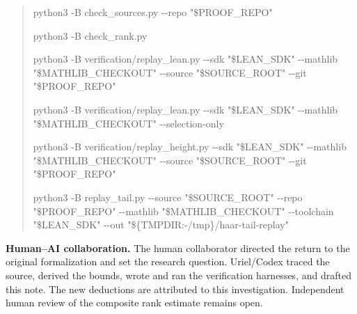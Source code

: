 \documentclass[11pt,letterpaper]{article}
\begin{document}
\begin{quote}\raggedright\setlength{\parskip}{1pt}
{\ttfamily\small python3 -\allowbreak{}B check\_\allowbreak{}sources.\allowbreak{}py -\allowbreak{}-\allowbreak{}repo "\$PROOF\_\allowbreak{}REPO"}\par
{\ttfamily\small python3 -\allowbreak{}B check\_\allowbreak{}rank.\allowbreak{}py}\par
{\ttfamily\small python3 -\allowbreak{}B verification/\allowbreak{}replay\_\allowbreak{}lean.\allowbreak{}py -\allowbreak{}-\allowbreak{}sdk "\$LEAN\_\allowbreak{}SDK" -\allowbreak{}-\allowbreak{}mathlib "\$MATHLIB\_\allowbreak{}CHECKOUT" -\allowbreak{}-\allowbreak{}source "\$SOURCE\_\allowbreak{}ROOT" -\allowbreak{}-\allowbreak{}git "\$PROOF\_\allowbreak{}REPO"}\par
{\ttfamily\small python3 -\allowbreak{}B verification/\allowbreak{}replay\_\allowbreak{}lean.\allowbreak{}py -\allowbreak{}-\allowbreak{}sdk "\$LEAN\_\allowbreak{}SDK" -\allowbreak{}-\allowbreak{}mathlib "\$MATHLIB\_\allowbreak{}CHECKOUT" -\allowbreak{}-\allowbreak{}selection-\allowbreak{}only}\par
{\ttfamily\small python3 -\allowbreak{}B verification/\allowbreak{}replay\_\allowbreak{}height.\allowbreak{}py -\allowbreak{}-\allowbreak{}sdk "\$LEAN\_\allowbreak{}SDK" -\allowbreak{}-\allowbreak{}mathlib "\$MATHLIB\_\allowbreak{}CHECKOUT" -\allowbreak{}-\allowbreak{}source "\$SOURCE\_\allowbreak{}ROOT" -\allowbreak{}-\allowbreak{}git "\$PROOF\_\allowbreak{}REPO"}\par
{\ttfamily\small python3 -\allowbreak{}B replay\_\allowbreak{}tail.\allowbreak{}py -\allowbreak{}-\allowbreak{}source "\$SOURCE\_\allowbreak{}ROOT" -\allowbreak{}-\allowbreak{}repo "\$PROOF\_\allowbreak{}REPO" -\allowbreak{}-\allowbreak{}mathlib "\$MATHLIB\_\allowbreak{}CHECKOUT" -\allowbreak{}-\allowbreak{}toolchain "\$LEAN\_\allowbreak{}SDK" -\allowbreak{}-\allowbreak{}out "\$\{TMPDIR:\allowbreak{}-\allowbreak{}/\allowbreak{}tmp\}/\allowbreak{}haar-\allowbreak{}tail-\allowbreak{}replay"}\par
\end{quote}
\textbf{Human–AI collaboration.} The human collaborator directed the return to the original formalization and set the research question. Uriel/Codex traced the source, derived the bounds, wrote and ran the verification harnesses, and drafted this note. The new deductions are attributed to this investigation. Independent human review of the composite rank estimate remains open.
\end{document}
